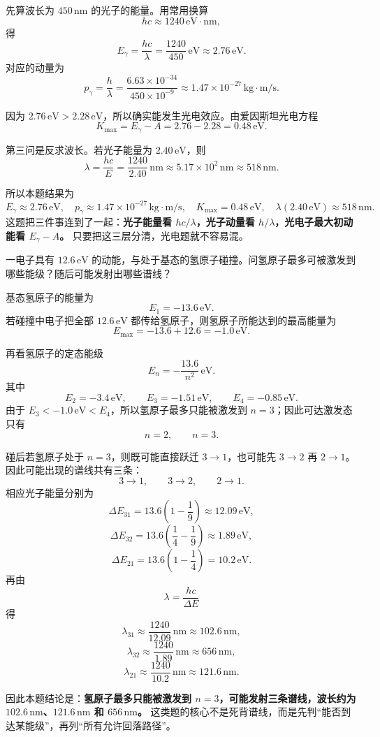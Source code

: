 \documentclass[lang=cn,11pt]{elegantbook}
\begin{document}
\begin{solution}
先算波长为 \(450\,\mathrm{nm}\) 的光子的能量。用常用换算
\[
hc\approx 1240\,\mathrm{eV\cdot nm},
\]
得
\[
E_\gamma=\frac{hc}{\lambda}
=\frac{1240}{450}\,\mathrm{eV}
\approx 2.76\,\mathrm{eV}.
\]
对应的动量为
\[
\displaystyle p_\gamma=\frac{h}{\lambda}
=\frac{6.63\times 10^{-34}}{450\times 10^{-9}}
\approx 1.47\times 10^{-27}\,\mathrm{kg\cdot m/s}.
\]

因为 \(2.76\,\mathrm{eV}>2.28\,\mathrm{eV}\)，所以确实能发生光电效应。由爱因斯坦光电方程
\[
K_{\max}=E_\gamma-A=2.76-2.28=0.48\,\mathrm{eV}.
\]

第三问是反求波长。若光子能量为 \(2.40\,\mathrm{eV}\)，则
\[
\lambda=\frac{hc}{E}
=\frac{1240}{2.40}\,\mathrm{nm}
\approx 5.17\times 10^2\,\mathrm{nm}
\approx 518\,\mathrm{nm}.
\]

所以本题结果为
\[
\boxed{E_\gamma\approx 2.76\,\mathrm{eV},\quad
p_\gamma\approx 1.47\times 10^{-27}\,\mathrm{kg\cdot m/s},\quad
K_{\max}=0.48\,\mathrm{eV},\quad
\lambda(2.40\,\mathrm{eV})\approx 518\,\mathrm{nm}.}
\]
这题把三件事连到了一起：\textbf{光子能量看 \(hc/\lambda\)，光子动量看 \(h/\lambda\)，光电子最大初动能看 \(E_\gamma-A\)。} 只要把这三层分清，光电题就不容易混。
\end{solution}

\begin{example}[12.6\,eV 电子轰击基态氢原子时会出现哪些谱线]
一电子具有 \(12.6\,\mathrm{eV}\) 的动能，与处于基态的氢原子碰撞。问氢原子最多可被激发到哪些能级？随后可能发射出哪些谱线？
\end{example}

\begin{solution}
基态氢原子的能量为
\[
E_1=-13.6\,\mathrm{eV}.
\]
若碰撞中电子把全部 \(12.6\,\mathrm{eV}\) 都传给氢原子，则氢原子所能达到的最高能量为
\[
E_{\max}=-13.6+12.6=-1.0\,\mathrm{eV}.
\]

再看氢原子的定态能级
\[
E_n=-\frac{13.6}{n^2}\,\mathrm{eV}.
\]
其中
\[
E_2=-3.4\,\mathrm{eV},\qquad
E_3=-1.51\,\mathrm{eV},\qquad
E_4=-0.85\,\mathrm{eV}.
\]
由于 \(E_3<-1.0\,\mathrm{eV}<E_4\)，所以氢原子最多只能被激发到 \(n=3\)；因此可达激发态只有
\[
n=2,\qquad n=3.
\]

碰后若氢原子处于 \(n=3\)，则既可能直接跃迁 \(3\to 1\)，也可能先 \(3\to 2\) 再 \(2\to 1\)。因此可能出现的谱线共有三条：
\[
3\to 1,\qquad 3\to 2,\qquad 2\to 1.
\]
相应光子能量分别为
\[
\Delta E_{31}=13.6\left(1-\frac19\right)\approx 12.09\,\mathrm{eV},
\]
\[
\Delta E_{32}=13.6\left(\frac14-\frac19\right)\approx 1.89\,\mathrm{eV},
\]
\[
\Delta E_{21}=13.6\left(1-\frac14\right)=10.2\,\mathrm{eV}.
\]
再由
\[
\lambda=\frac{hc}{\Delta E}
\]
得
\[
\lambda_{31}\approx \frac{1240}{12.09}\,\mathrm{nm}\approx 102.6\,\mathrm{nm},
\]
\[
\lambda_{32}\approx \frac{1240}{1.89}\,\mathrm{nm}\approx 656\,\mathrm{nm},
\]
\[
\lambda_{21}\approx \frac{1240}{10.2}\,\mathrm{nm}\approx 121.6\,\mathrm{nm}.
\]

因此本题结论是：\textbf{氢原子最多只能被激发到 \(n=3\)，可能发射三条谱线，波长约为 \(102.6\,\mathrm{nm}\)、\(121.6\,\mathrm{nm}\) 和 \(656\,\mathrm{nm}\)。} 这类题的核心不是死背谱线，而是先判“能否到达某能级”，再列“所有允许回落路径”。
\end{solution}
\end{document}

